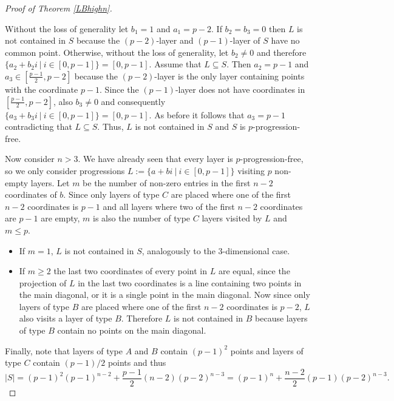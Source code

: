 \documentclass[12pt]{amsart}
\newcommand{\<}{\langle}
\renewcommand{\>}{\rangle}
\numberwithin{equation}{section}
\numberwithin{theorem}{section}
\begin{document}
\begin{proof}[Proof of Theorem \ref{LBhighn}]
\begin{itemize}
\noindent
Without the loss of generality let $b_1=1$ and $a_1=p-2$. If $b_2=b_3=0$ then $L$ is not contained in $S$ because  the $(p-2)$-layer and $(p-1)$-layer of $S$ have no common point.
Otherwise, without the loss of generality, let $b_2\neq 0$ and therefore $\{a_2+b_2i\ |\ i\in [0,p-1]\}=[0,p-1].$ Assume that $L\subseteq S$. Then $a_2=p-1$ and $a_3\in [\frac{p-1}{2},p-2]$ because the $(p-2)$-layer is the only layer containing points with the coordinate $p-1$. Since the  $(p-1)$-layer does not have coordinates in $[\frac{p-1}{2},p-2]$, also $b_3\neq 0$ and consequently  $\{a_3+b_3i\ |\ i\in [0,p-1]\}=[0,p-1].$ As before it follows that $a_3=p-1$ contradicting that $L\subseteq S$. Thus, $L$ is not contained in $S$ and $S$ is $p$-progression-free.
\end{itemize}

Now consider $n>3$. We have already seen that every layer is $p$-progression-free, so we only consider progressions  $L:=\{a+bi \ |\  i\in [0,p-1]\}$ visiting $p$ non-empty layers. Let $m$ be the number of non-zero entries in the first $n-2$ coordinates of $b$. Since only layers of type $C$ are placed where one of the first $n-2$ coordinates is $p-1$ and all layers where two of the first $n-2$ coordinates are $p-1$ are empty, $m$ is also the number of type $C$ layers visited by $L$ and $m\leq p$.

\begin{itemize}
    \item If $m=1$, $L$ is not contained in $S$, analogously to the $3$-dimensional case.

    \item If $m\geq 2$ the last two coordinates of every point in $L$ are equal, since the projection of $L$ in the last two coordinates is a line containing two points in the main diagonal, or it is a single point in the main diagonal. Now since only layers of type $B$ are placed where one of the first $n-2$ coordinates is $p-2$, $L$ also visits a layer of type $B$. Therefore $L$ is not contained in $B$ because layers of type $B$ contain no points on the main diagonal.
\end{itemize}

Finally, note that layers of type $A$ and $B$ contain $(p-1)^2$ points and layers of type $C$ contain $(p-1)/2$ points and thus $$|S|=(p-1)^2(p-1)^{n-2}+\frac{p-1}{2}(n-2)(p-2)^{n-3}=(p-1)^n+\frac{n-2}{2}(p-1)(p-2)^{n-3}.$$

\end{proof}
\end{document}
